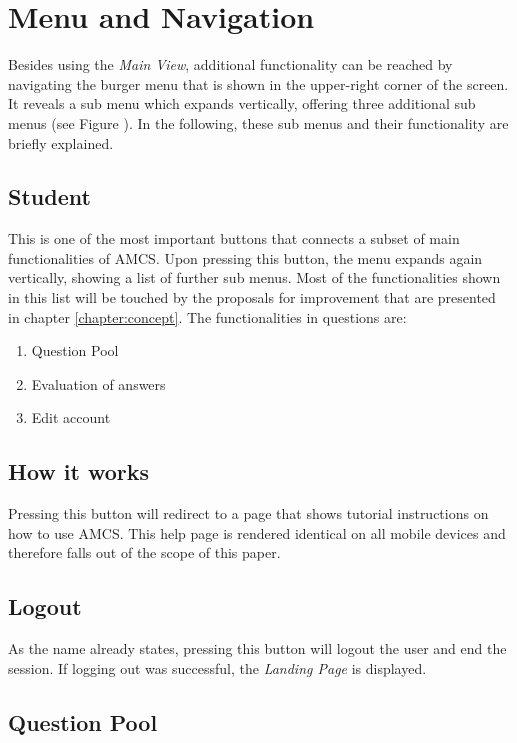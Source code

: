 \section{Menu and Navigation}
Besides using the \emph{Main View}, additional functionality can be reached by navigating the burger menu that is shown in the upper-right corner of the screen. It reveals a sub menu which expands vertically, offering three additional sub menus (see Figure \todosct). In the following, these sub menus and their functionality are briefly explained.

\subsection{Student}

This is one of the most important buttons that connects a subset of main functionalities of AMCS. Upon pressing this button, the menu expands again vertically, showing a list of further sub menus. Most of the functionalities shown in this list will be touched by the proposals for improvement that are presented in chapter \ref{chapter:concept}. The functionalities in questions are:

\begin{enumerate}
	\item Question Pool
	\item Evaluation of answers
	\item Edit account
\end{enumerate}


\subsection{How it works}

Pressing this button will redirect to a page that shows tutorial instructions on how to use AMCS.
This help page is rendered identical on all mobile devices and therefore falls out of the scope of this paper.

\subsection{Logout}

As the name already states, pressing this button will logout the user and end the session. 
If logging out was successful, the \emph{Landing Page} is displayed.

\subsection{Question Pool}


